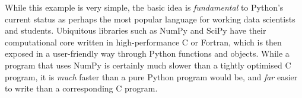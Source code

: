 While this example is very simple, the basic idea is
\textit{fundamental} to Python's current status as perhaps the most
popular language for working data scientists and students.  Ubiquitous
libraries such as NumPy and SciPy have their computational core
written in high-performance C or Fortran, which is then exposed in a
user-friendly way through Python functions and objects.  While a
program that uses NumPy is certainly much slower than a tightly
optimised C program, it is \textit{much} faster than a pure Python
program would be, and \textit{far} easier to write than a
corresponding C program.

